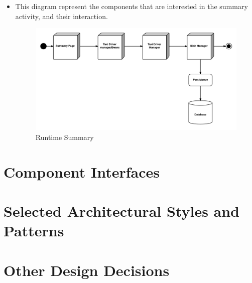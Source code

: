 \begin{itemize}
	\item This diagram represent the components that are interested in the summary activity, and their interaction.
	\begin{figure}[htbp]
	\centering
	\includegraphics[width=\textwidth]{cpt/img/RuntimeSummaryView}
	\caption{Runtime Summary}
	\end{figure}
	\clearpage

\end{itemize}

\section{Component Interfaces}

\section{Selected Architectural Styles and Patterns}

\section{Other Design Decisions}